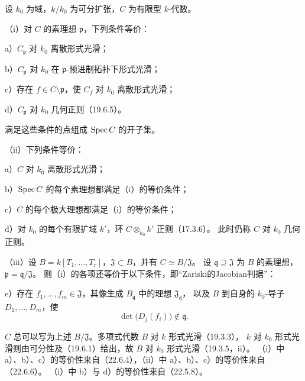 设 $k_0$ 为域，$k/k_0$ 为可分扩张，$C$ 为有限型 $k$-代数。

\noindent（i）对 $C$ 的素理想 $\mathfrak p$，下列条件等价：

\noindent a）$C_{\mathfrak p}$ 对 $k_0$ 离散形式光滑；

\noindent b）$C_{\mathfrak p}$ 对 $k_0$ 在 $\mathfrak p$-预进制拓扑下形式光滑；

\noindent c）存在 $f\in C\setminus\mathfrak p$，使 $C_f$ 对 $k_0$ 离散形式光滑；

\noindent d）$C_{\mathfrak p}$ 对 $k_0$ 几何正则（19.6.5）。

满足这些条件的点组成 $\operatorname{Spec} C$ 的开子集。

\noindent（ii）下列条件等价：

\noindent a）$C$ 对 $k_0$ 离散形式光滑；

\noindent b）$\operatorname{Spec} C$ 的每个素理想都满足（i）的等价条件；

\noindent c）$C$ 的每个极大理想都满足（i）的等价条件；

\noindent d）对 $k_0$ 的每个有限扩域 $k'$，环 $C\otimes_{k_0}k'$ 正则（17.3.6）。
此时仍称 $C$ 对 $k_0$ 几何正则。

\noindent（iii）设 $B=k[T_1,\ldots,T_r]$，$\mathfrak J\subset B$，并有 $C\simeq B/\mathfrak J$。
设 $\mathfrak q\supseteq\mathfrak J$ 为 $B$ 的素理想，$\mathfrak p=\mathfrak q/\mathfrak J$。
则（i）的各项还等价于以下条件，即“Zariski的Jacobian判据”：

\noindent e）存在 $f_1,\ldots,f_m\in\mathfrak J$，其像生成 $B_{\mathfrak q}$ 中的理想 $\mathfrak J_{\mathfrak q}$，
以及 $B$ 到自身的 $k_0$-导子 $D_1,\ldots,D_m$，使
\[
 \det\bigl(D_j(f_i)\bigr)\notin\mathfrak q.
\]


\eproof
$C$ 总可以写为上述 $B/\mathfrak J$。多项式代数 $B$ 对 $k$ 形式光滑（19.3.3），
$k$ 对 $k_0$ 形式光滑则由可分性及（19.6.1）给出，故 $B$ 对 $k_0$ 形式光滑（19.3.5，ii）。
（i）中 a）、b）、c）的等价性来自（22.6.4），（ii）中 a）、b）、c）的等价性来自（22.6.6）。
（i）中 b）与 d）的等价性来自（22.5.8）。

